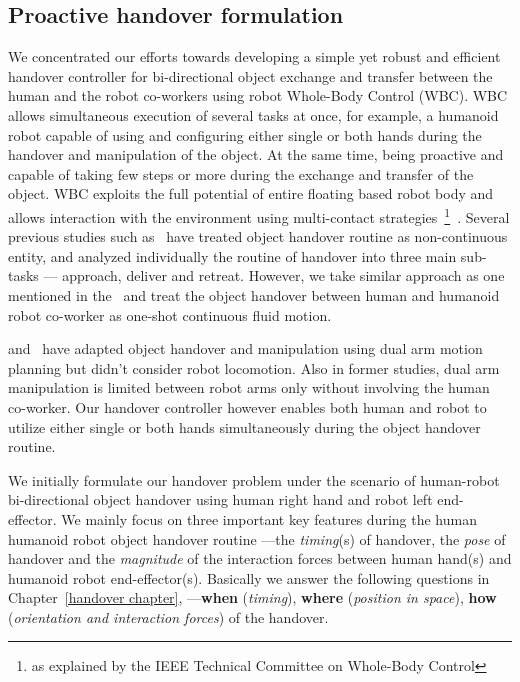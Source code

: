 \subsection{Proactive handover formulation}

We concentrated our efforts towards developing a simple yet robust and efficient handover controller for bi-directional object exchange and transfer between the human and the robot co-workers using robot Whole-Body Control (WBC). WBC allows simultaneous execution of several tasks at once, for example, a humanoid robot capable of using and configuring either single or both hands during the handover and manipulation of the object. At the same time, being proactive and capable of taking few steps or more during the exchange and transfer of the object. WBC exploits the full potential of entire floating based robot body and allows interaction with the environment using multi-contact strategies~\footnote{as explained by the IEEE Technical Committee on Whole-Body Control}~\cite{ladder-HRP-2Kai}. Several previous studies such as~\cite{strabala2013toward, huber2008human} have treated object handover routine as non-continuous entity, and analyzed individually the routine of handover into three main sub-tasks — approach, deliver and retreat. However, we take similar approach as one mentioned in the~\cite{medina2016human, nemlekarprompt} and treat the object handover between human and humanoid robot co-worker as one-shot continuous fluid motion.

\cite{vahrenkamp2009humanoid, vezzani2017novel} and~\cite{kim2004advanced} have adapted object handover and manipulation using dual arm motion planning but didn't consider robot locomotion. Also in former studies, dual arm manipulation is limited between robot arms only without involving the human co-worker. Our handover controller however enables both human and robot to utilize either single or both hands simultaneously during the object handover routine.

We initially formulate our handover problem under the scenario of human-robot bi-directional object handover using human right hand and robot left end-effector. We mainly focus on three important key features during the human humanoid robot object handover routine ---the \textit{timing}(s) of handover, the \textit{pose} of handover and the \textit{magnitude} of the interaction forces between human hand(s) and humanoid robot end-effector(s). Basically we answer the following questions in Chapter~\ref{handover chapter}, ---\textbf{when} (\textit{timing}), \textbf{where} (\textit{position in space}), \textbf{how} (\textit{orientation and interaction forces}) of the handover.

